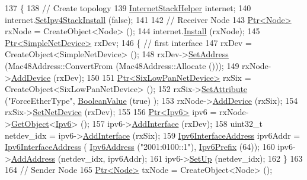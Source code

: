 \begin{DoxyCode}
137 \{
138   \textcolor{comment}{// Create topology}
139   \hyperlink{classns3_1_1InternetStackHelper}{InternetStackHelper} internet;
140   internet.\hyperlink{classns3_1_1InternetStackHelper_a10e2a35f410d0d1c90d979542c8bfd6e}{SetIpv4StackInstall} (\textcolor{keyword}{false});
141 
142   \textcolor{comment}{// Receiver Node}
143   \hyperlink{classns3_1_1Ptr}{Ptr<Node>} rxNode = CreateObject<Node> ();
144   internet.\hyperlink{classns3_1_1InternetStackHelper_a6645b412f31283d2d9bc3d8a95cebbc0}{Install} (rxNode);
145   \hyperlink{classns3_1_1Ptr}{Ptr<SimpleNetDevice>} rxDev;
146   \{ \textcolor{comment}{// first interface}
147     rxDev = CreateObject<SimpleNetDevice> ();
148     rxDev->\hyperlink{classns3_1_1SimpleNetDevice_a968ef3e7318bac29d5f1d7d977029af4}{SetAddress} (Mac48Address::ConvertFrom (Mac48Address::Allocate ()));
149     rxNode->\hyperlink{classns3_1_1Node_a42ff83ee1d5d1649c770d3f5b62375de}{AddDevice} (rxDev);
150 
151     \hyperlink{classns3_1_1Ptr}{Ptr<SixLowPanNetDevice>} rxSix = CreateObject<SixLowPanNetDevice> ();
152     rxSix->\hyperlink{classns3_1_1ObjectBase_ac60245d3ea4123bbc9b1d391f1f6592f}{SetAttribute} (\textcolor{stringliteral}{"ForceEtherType"}, \hyperlink{classns3_1_1BooleanValue}{BooleanValue} (\textcolor{keyword}{true}) );
153     rxNode->\hyperlink{classns3_1_1Node_a42ff83ee1d5d1649c770d3f5b62375de}{AddDevice} (rxSix);
154     rxSix->\hyperlink{classns3_1_1SixLowPanNetDevice_a81c74a5dc06e3fbad1a8b1c59d1f68fa}{SetNetDevice} (rxDev);
155 
156     \hyperlink{classns3_1_1Ptr}{Ptr<Ipv6>} ipv6 = rxNode->\hyperlink{classns3_1_1Object_a13e18c00017096c8381eb651d5bd0783}{GetObject}<\hyperlink{classns3_1_1Ipv6}{Ipv6}> ();
157     ipv6->\hyperlink{classns3_1_1Ipv6_a4fd7da82c16b8abf9ca15f982918e6a4}{AddInterface} (rxDev);
158     uint32\_t netdev\_idx = ipv6->\hyperlink{classns3_1_1Ipv6_a4fd7da82c16b8abf9ca15f982918e6a4}{AddInterface} (rxSix);
159     \hyperlink{classns3_1_1Ipv6InterfaceAddress}{Ipv6InterfaceAddress} ipv6Addr = \hyperlink{classns3_1_1Ipv6InterfaceAddress}{Ipv6InterfaceAddress} (
      \hyperlink{classns3_1_1Ipv6Address}{Ipv6Address} (\textcolor{stringliteral}{"2001:0100::1"}), \hyperlink{classns3_1_1Ipv6Prefix}{Ipv6Prefix} (64));
160     ipv6->\hyperlink{classns3_1_1Ipv6_a5cd576e83cf65445be3a0b5ffd1ddc5c}{AddAddress} (netdev\_idx, ipv6Addr);
161     ipv6->\hyperlink{classns3_1_1Ipv6_a8e61d85ec7fd342ed38fef2d040ed1b9}{SetUp} (netdev\_idx);
162   \}
163 
164   \textcolor{comment}{// Sender Node}
165   \hyperlink{classns3_1_1Ptr}{Ptr<Node>} txNode = CreateObject<Node> ();

\end{DoxyCode}
